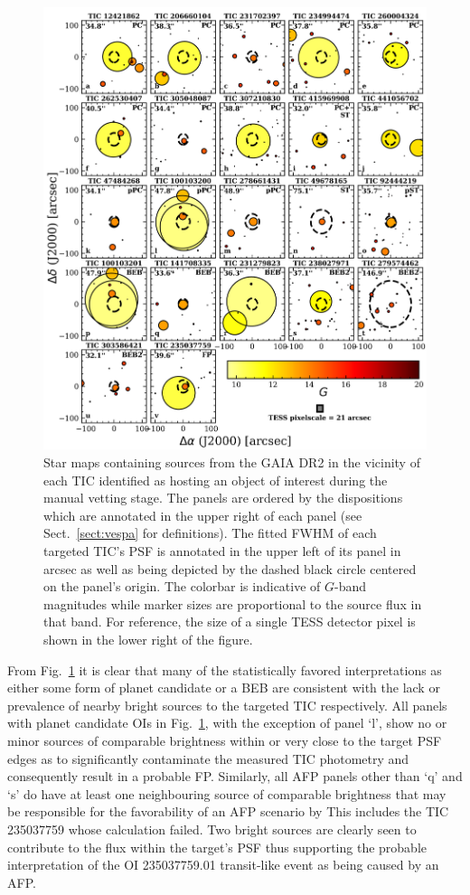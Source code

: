 \begin{figure}
  \centering
  \includegraphics[width=0.8\hsize]{figures/GAIAFPs.png}
  \caption[GAIA sources around TICs with \texttt{ORION} planet candidates.]
      {Star maps containing sources from the GAIA DR2 in the vicinity of each TIC identified
    as hosting an object of interest during the manual vetting stage. The panels are ordered by the
    dispositions which are annotated in the upper right of each panel (see Sect.~\ref{sect:vespa} for
    definitions). The fitted FWHM of each targeted TIC's PSF is annotated in the upper left
    of its panel in arcsec as well as being depicted by the dashed black circle centered on the
    panel's origin. The colorbar is indicative of $G$-band magnitudes while marker sizes are proportional
    to the source flux in that band. For reference, the size of a single TESS detector pixel is shown
    in the lower right of the figure.}
  \label{fig:gaiafps}
\end{figure}

From Fig.~\ref{fig:gaiafps} it is clear that many of the statistically favored interpretations as either 
some form of planet candidate or a BEB are consistent with the lack or prevalence of nearby bright sources
to the targeted TIC respectively.
All panels with planet candidate OIs in Fig.~\ref{fig:gaiafps}, with the exception of panel `l', show no
or minor sources of comparable brightness within or very close to the target PSF edges as to significantly
contaminate the measured TIC photometry and consequently result in a probable FP.
Similarly, all AFP panels other than `q'
and `s' do have at least one neighbouring source of comparable brightness that may be responsible
for the favorability of an AFP scenario by 
This includes the TIC 235037759 whose \vespa{} calculation failed.
Two bright sources are clearly seen to contribute to the flux within the target's PSF thus supporting the
probable interpretation of the OI 235037759.01 transit-like event as being caused by an AFP.

